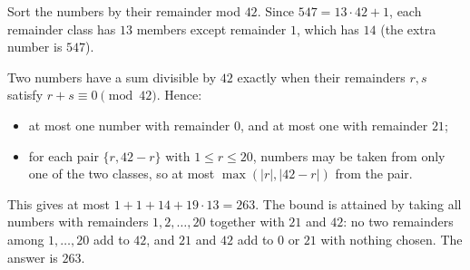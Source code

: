Sort the numbers by their remainder mod $42$. Since $547=13\cdot42+1$, each remainder class has $13$ members except remainder $1$, which has $14$ (the extra number is $547$).

Two numbers have a sum divisible by $42$ exactly when their remainders $r,s$ satisfy $r+s\equiv0\pmod{42}$. Hence:
\begin{itemize}
\item at most one number with remainder $0$, and at most one with remainder $21$;
\item for each pair $\{r,42-r\}$ with $1\le r\le20$, numbers may be taken from only one of the two classes, so at most $\max(|r|,|42-r|)$ from the pair.
\end{itemize}
This gives at most $1+1+14+19\cdot13=263$. The bound is attained by taking all numbers with remainders $1,2,\dots,20$ together with $21$ and $42$: no two remainders among $1,\dots,20$ add to $42$, and $21$ and $42$ add to $0$ or $21$ with nothing chosen. The answer is $\boxed{263}$.
